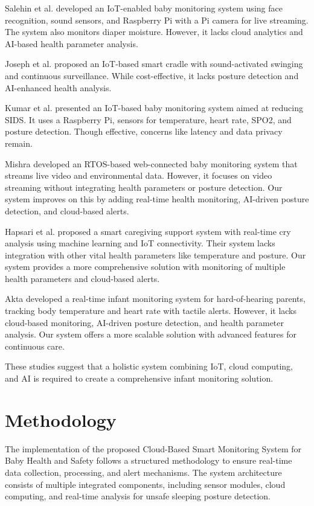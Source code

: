 \documentclass[conference]{IEEEtran}
\begin{document}
Salehin et al. developed an IoT-enabled baby monitoring system using face recognition, sound sensors, and Raspberry Pi with a Pi camera for live streaming. The system also monitors diaper moisture. However, it lacks cloud analytics and AI-based health parameter analysis\cite{ref4}.

Joseph et al. proposed an IoT-based smart cradle with sound-activated swinging and continuous surveillance. While cost-effective, it lacks posture detection and AI-enhanced health analysis\cite{ref5}.

Kumar et al. presented an IoT-based baby monitoring system aimed at reducing SIDS. It uses a Raspberry Pi, sensors for temperature, heart rate, SPO2, and posture detection. Though effective, concerns like latency and data privacy remain\cite{ref6}.

Mishra developed an RTOS-based web-connected baby monitoring system that streams live video and environmental data. However, it focuses on video streaming without integrating health parameters or posture detection. Our system improves on this by adding real-time health monitoring, AI-driven posture detection, and cloud-based alerts\cite{ref7}.

Hapsari et al. proposed a smart caregiving support system with real-time cry analysis using machine learning and IoT connectivity. Their system lacks integration with other vital health parameters like temperature and posture. Our system provides a more comprehensive solution with monitoring of multiple health parameters and cloud-based alerts\cite{ref8}.

Akta developed a real-time infant monitoring system for hard-of-hearing parents, tracking body temperature and heart rate with tactile alerts. However, it lacks cloud-based monitoring, AI-driven posture detection, and health parameter analysis. Our system offers a more scalable solution with advanced features for continuous care\cite{ref9}.

These studies suggest that a holistic system combining IoT, cloud computing, and AI is required to create a comprehensive infant monitoring solution.
\section{Methodology}
The implementation of the proposed Cloud-Based Smart Monitoring System for Baby Health and Safety follows a structured methodology to ensure real-time data collection, processing, and alert mechanisms. The system architecture consists of multiple integrated components, including sensor modules, cloud computing, and real-time analysis for unsafe sleeping posture detection.
\end{document}
